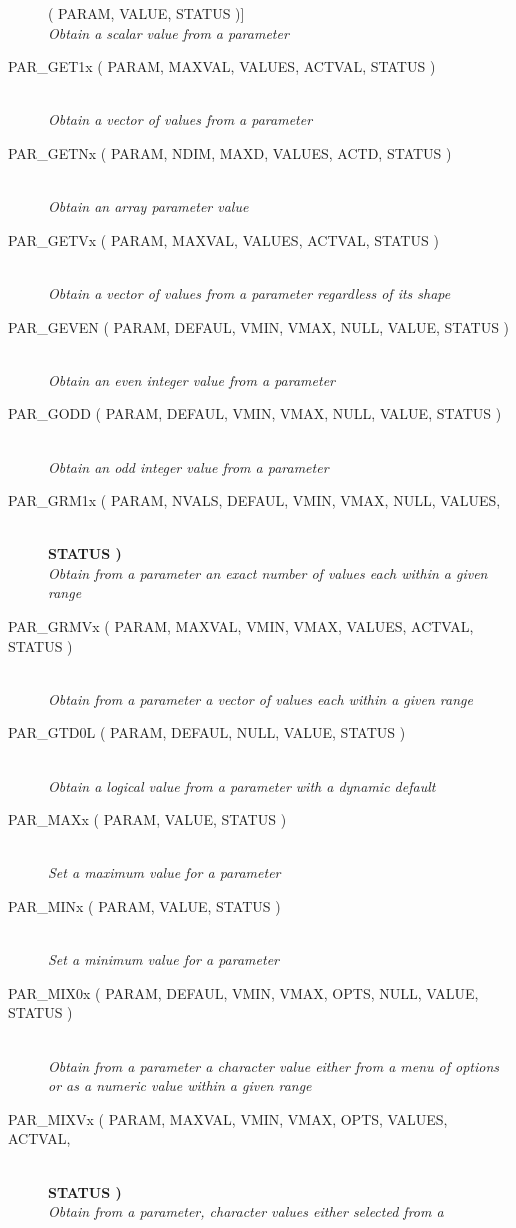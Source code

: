 \documentclass[twoside,11pt]{article}
\newcommand{\htmlref}[2]{#1}
\newcommand{\listline}{\hspace{1pt}\\}
\newcommand{\listova}[1]{}
\newcommand{\listovb}[1]{\textbf{#1}\\}
\newcommand{\listline}{}
\newcommand{\listova}[1]{#1}
\newcommand{\listovb}[1]{}
\begin{document}
\begin{description}
( PARAM, VALUE, STATUS )] \listline
\textit{Obtain a scalar value from a parameter}
\item [\htmlref{PAR\_GET1x}{PAR_GET1x} 
( PARAM, MAXVAL, VALUES, ACTVAL, STATUS )] \listline
\textit{Obtain a vector of values from a parameter}
\item [\htmlref{PAR\_GETNx}{PAR_GETNx} 
( PARAM, NDIM, MAXD, VALUES, ACTD, STATUS )] \listline
\textit{Obtain an array parameter value}
\item [\htmlref{PAR\_GETVx}{PAR_GETVx} 
( PARAM, MAXVAL, VALUES, ACTVAL, STATUS )] \listline
\textit{Obtain a vector of values from a parameter regardless of its shape}
\item [\htmlref{PAR\_GEVEN}{PAR_GEVEN} 
( PARAM, DEFAUL, VMIN, VMAX, NULL, VALUE, STATUS )] \listline
\textit{Obtain an even integer value from a parameter}
\item [\htmlref{PAR\_GODD}{PAR_GODD} 
( PARAM, DEFAUL, VMIN, VMAX, NULL, VALUE, STATUS )] \listline
\textit{Obtain an odd integer value from a parameter}
\item [\htmlref{PAR\_GRM1x}{PAR_GRM1x} 
( PARAM, NVALS, DEFAUL, VMIN, VMAX, NULL, VALUES, \listova{STATUS )}] \listline
\listovb{STATUS )}
\textit{Obtain from a parameter an exact number of values each within a
            given range}
\item [\htmlref{PAR\_GRMVx}{PAR_GRMVx} 
( PARAM, MAXVAL, VMIN, VMAX, VALUES, ACTVAL, STATUS )] \listline
\textit{Obtain from a parameter a vector of values each within a given
            range}
\item [\htmlref{PAR\_GTD0L}{PAR_GTD0L} 
( PARAM, DEFAUL, NULL, VALUE, STATUS )] \listline
\textit{Obtain a logical value from a parameter with a dynamic default}
\item [\htmlref{PAR\_MAXx}{PAR_MAXx} 
( PARAM, VALUE, STATUS )] \listline
\textit{Set a maximum value for a parameter}
\item [\htmlref{PAR\_MINx}{PAR_MINx} 
( PARAM, VALUE, STATUS )] \listline
\textit{Set a minimum value for a parameter}
\item [\htmlref{PAR\_MIX0x}{PAR_MIX0x} 
( PARAM, DEFAUL, VMIN, VMAX, OPTS, NULL, VALUE, STATUS )] \listline
\textit{Obtain from a parameter a character value either from a menu of
            options or as a numeric value within a given range}
\item [\htmlref{PAR\_MIXVx}{PAR_MIXVx} 
( PARAM, MAXVAL, VMIN, VMAX, OPTS, VALUES, ACTVAL, \listova{STATUS )}] \listline
\listovb{STATUS )}
\textit{Obtain from a parameter, character values either selected from a
}
\end{description}
\end{document}
